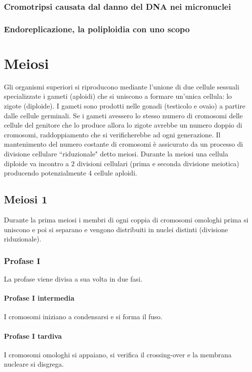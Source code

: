 \subsubsection{Cromotripsi causata dal danno del DNA nei micronuclei}

\subsubsection{Endoreplicazione, la poliploidia con uno scopo}

\section{Meiosi}
Gli organismi superiori si riproducono mediante l'unione di due cellule sessuali specializzate i gameti (aploidi) che si uniscono a formare un'unica cellula: lo zigote (diploide). I 
gameti sono prodotti nelle gonadi (testicolo e ovaio) a partire dalle cellule germinali. Se i gameti avessero lo stesso numero di cromosomi delle cellule del genitore che lo produce 
allora lo zigote avrebbe un numero doppio di cromosomi, raddoppiamento che si verificherebbe ad ogni generazione. Il mantenimento del numero costante di cromosomi \`e assicurato da
un processo di divisione cellulare ``riduzionale" detto meiosi. Durante la meiosi una cellula diploide va incontro a $2$ divisioni cellulari (prima e seconda divisione meiotica) 
producendo potenzialmente $4$ cellule aploidi.
\subsection{Meiosi $\mathbf{1}$}
Durante la prima meiosi i membri di ogni coppia di cromosomi omologhi prima si uniscono e poi si separano e vengono distribuiti in nuclei distinti (divisione riduzionale). 
\subsubsection{Profase $\mathbf{I}$}
La profase viene divisa a sua volta in due fasi.
\paragraph{Profase $\mathbf{I}$ intermedia}
I cromosomi iniziano a condensarsi e si forma il fuso. 
\paragraph{Profase $\mathbf{I}$ tardiva}
I cromosomi omologhi si appaiano, si verifica il crossing-over e la membrana nucleare si disgrega.
